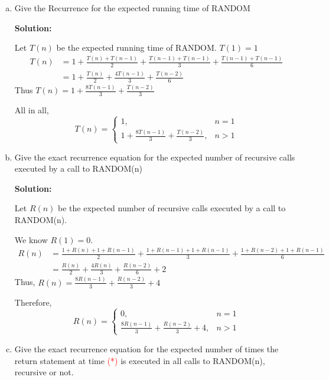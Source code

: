 \documentclass[11pt]{article} %
\begin{document}
\begin{enumerate}[(a)]
    \item Give the Recurrence for the expected running  time of RANDOM
    
    \textbf{Solution:}

    Let $T(n)$ be the expected running time of RANDOM.
    $T(1) = 1$
    \begin{align*}
        T(n) &= 1 + \frac{T(n)+T(n-1)}{2}+\frac{T(n-1)+T(n-1)}{3}+\frac{T(n-1)+T(n-1)}{6}\\
             &= 1+ \frac{T(n)}{2}+\frac{4T(n-1)}{3}+\frac{T(n-2)}{6}
    \end{align*}
    Thus $T(n) = 1+\frac{8T(n-1)}{3} +  \frac{T(n-2)}{3}$

    All in all, 
    \begin{equation*}
        T(n) = \begin{cases}
            1, & n = 1\\
            1+\frac{8T(n-1)}{3} +  \frac{T(n-2)}{3}, &n > 1
        \end{cases}
    \end{equation*}


    \item Give the exact recurrence equation for the expected number of recursive calls executed by  a call to RANDOM(n)
    
    \textbf{Solution:}

    Let $R(n)$ be the expected number of recursive calls executed by a call to RANDOM(n). 

    We know $R(1)=0$.
    \begin{align*}
        R(n) &=  \frac{1+R(n)+1+R(n-1)}{2}+\frac{1+R(n-1)+1+R(n-1)}{3}+\frac{1+R(n-2)+1+R(n-1)}{6}\\
            &= \frac{R(n)}{2}+\frac{4R(n)}{3}+\frac{R(n-2)}{6}+2
    \end{align*}
     Thus, $R(n) = \frac{8R(n-1)}{3} + \frac{R(n-2)}{3}+4$
     
     Therefore,
     \begin{equation*}
        R(n) = \begin{cases}
            0, &n= 1\\
            \frac{8R(n-1)}{3} + \frac{R(n-2)}{3}+4, & n>1
        \end{cases}
     \end{equation*}

     \item Give the exact recurrence equation for the expected number of times the return statement  at  time \textcolor{red}{(*)} is executed in all calls to  RANDOM(n), recursive or not.
    

\end{enumerate}
\end{document}
